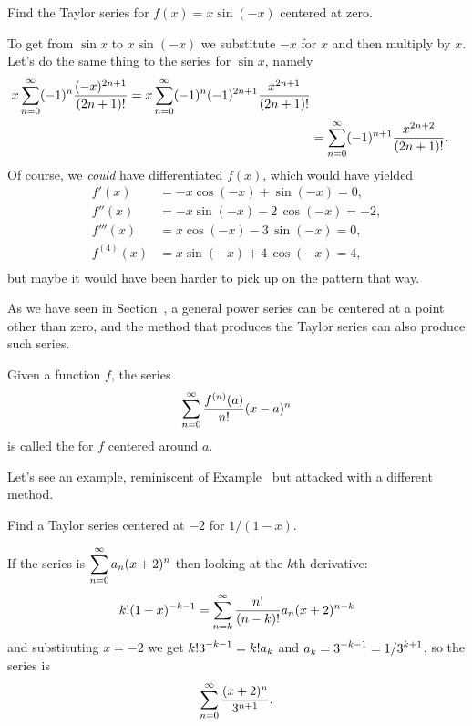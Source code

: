\begin{example} Find the Taylor series for $f(x) = x\sin(-x)$ centered at zero.
\end{example}
\begin{solution}
To get from $\sin x$ to $x\sin(-x)$ we substitute $-x$ for $x$ and
then multiply by $x$.  Let's do the same thing to the series for $\sin
x$, namely
\begin{align*}
  x\sum_{n=0}^\infty (-1)^n{(-x)^{2n+1}\over (2n+1)!} =x\sum_{n=0}^\infty (-1)^{n}(-1)^{2n+1}{x^{2n+1}\over (2n+1)!} \\
  &=\sum_{n=0}^\infty (-1)^{n+1}{x^{2n+2}\over (2n+1)!}.
\end{align*}
Of course, we \textit{could} have differentiated $f(x)$, which would have yielded
\begin{align*}
f'(x) &= -x \cos\left(-x\right) + \sin\left(-x\right) = 0, \\
f''(x) &= -x \sin\left(-x\right) - 2 \, \cos\left(-x\right) = -2, \\
f'''(x) &= x \cos\left(-x\right) - 3 \, \sin\left(-x\right) = 0, \\
f^{(4)}(x) &= x \sin\left(-x\right) + 4 \, \cos\left(-x\right) = 4, \\
\end{align*}
but maybe it would have been harder to pick up on the pattern that way.
\end{solution}

As we have seen in
Section~, a general
power series can be centered at a point other than zero, and the
method that produces the Taylor series can also produce such series.
\begin{definition}\label{defn:taylor-series}
Given a function $f$, the series
$$\sum_{n=0}^\infty {f^{(n)}(a)\over n!}(x-a)^n$$
is called the  for $f$ centered around $a$.
\end{definition}

Let's see an example, reminiscent of
Example~ but
attacked with a different method.
\begin{example} Find a Taylor series centered at $-2$ for $1/(1-x)$.
\end{example}

\begin{solution}
If the series is $\displaystyle\sum_{n=0}^\infty a_n(x+2)^n$ then looking at the
$k$th derivative:
$$k!(1-x)^{-k-1}=\sum_{n=k}^\infty {n!\over (n-k)!}a_n(x+2)^{n-k}$$
and substituting $x=-2$ we get
$\displaystyle k!3^{-k-1}=k!a_k$ and $\displaystyle a_k=3^{-k-1}=1/3^{k+1}$, so the series is
$$\sum_{n=0}^\infty {(x+2)^n\over 3^{n+1}}.$$
\end{solution}

